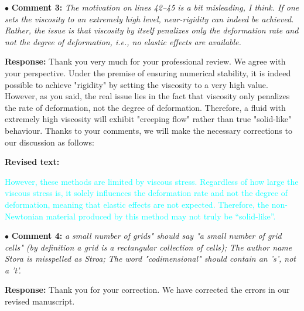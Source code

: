 \documentclass[12pt,a4paper]{article}
\newcommand{\revised}[1]{\textcolor{cyan}{#1}}
\begin{document}

\vspace{0.4cm}
\noindent$\bullet$ \enspace \textbf{Comment 3:}
\textit{The motivation on lines 42–45 is a bit misleading, I think. If one sets the viscosity to an extremely high level, near-rigidity can indeed be achieved. Rather, the issue is that viscosity by itself penalizes only the deformation rate and not the degree of deformation, i.e., no elastic effects are available. }

\vspace{0.2cm}
\textbf{Response:}
Thank you very much for your professional review. We agree with your perspective. Under the premise of ensuring numerical stability, it is indeed possible to achieve "rigidity" by setting the viscosity to a very high value. However, as you said, the real issue lies in the fact that viscosity only penalizes the rate of deformation, not the degree of deformation. Therefore, a fluid with extremely high viscosity will exhibit "creeping flow" rather than true "solid-like" behaviour. Thanks to your comments, we will make the necessary corrections to our discussion as follows:

\vspace{0.2cm}
\textbf{Revised text:}

\revised{
	However, these methods are limited by viscous stress. Regardless of how large the viscous stress is, it solely influences the deformation rate and not the degree of deformation, meaning that elastic effects are not expected. Therefore, the non-Newtonian material produced by this method may not truly be “solid-like”.
}



\vspace{0.4cm}
\noindent$\bullet$ \enspace \textbf{Comment 4:}
\textit{a small number of grids" should say "a small number of grid cells" (by definition a grid is a rectangular collection of cells); The author name Stora is misspelled as Stroa; The word "codimensional" should contain an 's', not a 't'.}

\vspace{0.2cm}
\textbf{Response:}
Thank you for your correction. We have corrected the errors in our revised manuscript.


\end{document}
